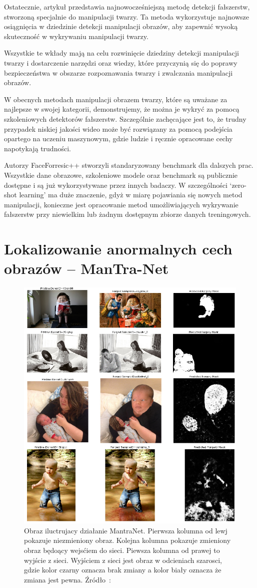 Ostatecznie, artykuł przedstawia najnowocześniejszą metodę detekcji fałszerstw, stworzoną specjalnie do manipulacji twarzy.
Ta metoda wykorzystuje najnowsze osiągnięcia w dziedzinie detekcji manipulacji obrazów, aby zapewnić wysoką skuteczność w wykrywaniu manipulacji twarzy.

Wszystkie te wkłady mają na celu rozwinięcie dziedziny detekcji manipulacji twarzy i dostarczenie narzędzi oraz wiedzy, które przyczynią się do poprawy bezpieczeństwa w obszarze rozpoznawania twarzy i zwalczania manipulacji obrazów.

W obecnych metodach manipulacji obrazem twarzy, które są uważane za najlepsze w swojej kategorii, demonstrujemy, że można je wykryć za pomocą szkoleniowych detektorów fałszerstw.
Szczególnie zachęcające jest to, że trudny przypadek niskiej jakości wideo może być rozwiązany za pomocą podejścia opartego na uczeniu maszynowym, gdzie ludzie i ręcznie opracowane cechy napotykają trudności.

Autorzy FaceForresic++ stworzyli standaryzowany benchmark dla dalszych prac.
Wszystkie dane obrazowe, szkoleniowe modele oraz benchmark są publicznie dostępne i są już wykorzystywane przez innych badaczy.
W szczególności `zero-shot learning' ma duże znaczenie, gdyż w miarę pojawiania się nowych metod manipulacji, konieczne jest opracowanie metod umożliwiających wykrywanie fałszerstw przy niewielkim lub żadnym dostępnym zbiorze danych treningowych.


\section{Lokalizowanie anormalnych cech obrazów -- ManTra-Net}

\begin{figure}[h]
    \centering
    \includegraphics[width=0.7\linewidth]{img/mantra-net-example}
    \caption{Obraz iluctrujacy działanie MantraNet. Pierwsza kolumna od lewj pokazuje niezmieniony obraz.
    Kolejna kolumna pokazuje zmieniony obraz będoący wejsćiem do sieci. Piewsza kolumna od prawej to wyjście z sieci.
    Wyjściem z sieci jest obraz w odcieniach szarosci, gdzie kolor czarny oznacza brak zmiany a kolor biały oznacza że zmiana jest pewna.
    Źródło~\cite{ManTraNet}:}
    \label{fig:mantra-net}
\end{figure}

